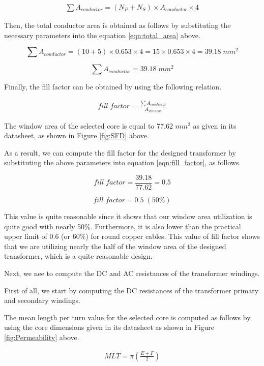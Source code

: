 \begin{align}
    \sum A_{conductor} = (N_P + N_S)\times A_{conductor}\times 4
    \label{eqn:total_area}
\end{align}

Then, the total conductor area is obtained as follows by substituting the necessary parameters into the equation \eqref{eqn:total_area} above.

$$ \sum A_{conductor} = (10 + 5)\times 0.653\times 4 = 15\times 0.653\times 4 = 39.18\;mm^2 $$

$$ \sum A_{conductor} = 39.18\;mm^2 $$

Finally, the fill factor can be obtained by using the following relation.

\begin{align}
    fill\;factor = \frac{\sum A_{conductor}}{A_{window}}
    \label{eqn:fill_factor}
\end{align}

The window area of the selected core is equal to 77.62 $mm^2$ as given in its datasheet, as shown in Figure \ref{fig:SFD} above.

As a result, we can compute the fill factor for the designed transformer by substituting the above parameters into equation \eqref{eqn:fill_factor}, as follows.

$$ fill\;factor = \frac{39.18}{77.62} = 0.5 $$

$$ fill\;factor = 0.5\; (50\%) $$

This value is quite reasonable since it shows that our window area utilization is quite good with nearly 50\%. Furthermore, it is also
lower than the practical upper limit of 0.6 (or 60\%) for round copper cables. This value of fill factor shows that we are utilizing nearly the half of the window area of the designed transformer, which is a quite reasonable design.

Next, we nee to compute the DC and AC resistances of the transformer windings.

First of all, we start by computing the DC resistances of the transformer primary and secondary windings.

The mean length per turn value for the selected core is computed as follows by using the core dimensions given in its datasheet as shown in Figure \ref{fig:Permeability} above.

\begin{align}
    MLT = \pi(\frac{E + F}{2})
    \label{eqn:mlt}
\end{align}

